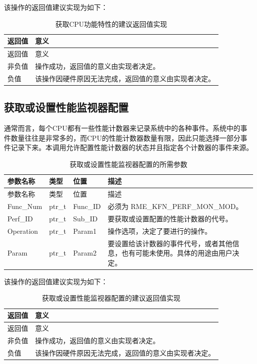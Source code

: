 该操作的返回值建议实现为如下：

\begin{xltabular}{\textwidth}{@{}>{\hsize\raggedright\arraybackslash}X>{\hsize\raggedright\arraybackslash}X@{}}
\caption{获取CPU功能特性的建议返回值实现}\label{tab:8-59-get-cpu-features-suggested-return-values}\\
\toprule
返回值 & 意义\tabularnewline
\endfirsthead
\toprule
返回值 & 意义\tabularnewline
\midrule
\endhead
\bottomrule
\endlastfoot
    非负值 & 操作成功，返回值的意义由实现者决定。\tabularnewline
    负值 & 该操作因硬件原因无法完成，返回值的意义由实现者决定。\tabularnewline
\end{xltabular}

\subsection{获取或设置性能监视器配置}\label{subsec:8-get-or-set-performance-monitor-configuration}

通常而言，每个CPU都有一些性能计数器来记录系统中的各种事件。系统中的事件数量往往是非常多的，而CPU的性能计数器数量有限，因此只能选择一部分事件记录下来。本调用允许配置性能计数器的状态并且指定各个计数器的事件来源。

\begin{xltabular}{\textwidth}{@{}>{\hsize\raggedright\arraybackslash}X>{\hsize\raggedright\arraybackslash}X>{\hsize\raggedright\arraybackslash}X>{\hsize\raggedright\arraybackslash}X@{}}
\caption{获取或设置性能监视器配置的所需参数}\label{tab:8-60-get-or-set-performance-monitor-configuration-parameters}\\
\toprule
参数名称 & 类型 & 位置 & 描述\tabularnewline
\endfirsthead
\toprule
参数名称 & 类型 & 位置 & 描述\tabularnewline
\midrule
\endhead
\bottomrule
\endlastfoot
Func\_Num & ptr\_t & Func\_ID & 必须为 RME\_KFN\_PERF\_MON\_MOD。\tabularnewline
Perf\_ID & ptr\_t & Sub\_ID &
要获取或设置配置的性能计数器的代号。\tabularnewline
Operation & ptr\_t & Param1 &
操作选项，决定了要进行的操作。\tabularnewline
Param & ptr\_t & Param2 &
要设置给该计数器的事件代号，或者其他信息，也有可能未使用。具体的用途由用户决定。\tabularnewline
\end{xltabular}

该操作的返回值建议实现为如下：

\begin{xltabular}{\textwidth}{@{}>{\hsize\raggedright\arraybackslash}X>{\hsize\raggedright\arraybackslash}X@{}}
\caption{获取或设置性能监视器配置的建议返回值实现}\label{tab:8-61-get-or-set-performance-monitor-configuration-suggested-return-values}\\
\toprule
返回值 & 意义\tabularnewline
\endfirsthead
\toprule
返回值 & 意义\tabularnewline
\midrule
\endhead
\bottomrule
\endlastfoot
    非负值 & 操作成功，返回值的意义由实现者决定。\tabularnewline
    负值 & 该操作因硬件原因无法完成，返回值的意义由实现者决定。\tabularnewline
\end{xltabular}

